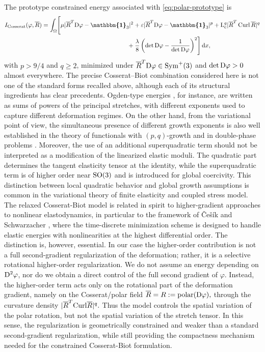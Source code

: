 \documentclass[11pt]{article}
\newcommand{\id}{{\boldsymbol{\mathbbm{1}}}}
\newcommand{\Curl}{{\rm Curl}}
\begin{document}
The prototype constrained energy associated with \eqref{eq:polar-prototype} is
\begin{align}
\label{eq:constrained-prototype}
I_{\rm Cosserat}(\varphi, \overline R )
=
\int_\Omega\Biggl[
&\mu| \overline R ^T{\rm D}\varphi-\id_3|^2
+
\varepsilon| \overline R ^T{\rm D}\varphi-\id_3|^p
+
{\rm L}_{\rm c}^q | \overline R ^T\operatorname{Curl} \overline R |^q
\notag\\
&\qquad \qquad \qquad \qquad \qquad \quad +
\frac\lambda8
\left(\det{\rm D}\varphi-\frac1{\det{\rm D}\varphi}\right)^2
\Biggr] \,\mathrm dx,
\end{align}
with $p>9/4$ and $q\geq 2$, minimized under
$
 \overline R ^T{\rm D}\varphi\in\operatorname{Sym}^{+}(3)
$
and $\det{\rm D}\varphi>0$ almost everywhere. 
The precise Cosserat--Biot combination considered here is not one of the standard forms recalled above, although each of its structural ingredients has clear precedents.  Ogden-type energies \cite{Ogden72a,Ogden83}, for instance, are written as sums
of powers of the principal stretches, with different exponents used to capture
different deformation regimes. On the  other hand, from the variational point of view, the simultaneous presence of different
growth exponents is also well established in the theory of functionals with
\((p,q)\)-growth and in double-phase problems \cite{Marcellini1,Marcellini2}. Moreover, the use of an additional superquadratic term should not be interpreted as a
modification of the linearized elastic moduli. The quadratic part determines
the tangent elasticity tensor at the identity, while the superquadratic term is
of higher order near \({\rm SO}(3)\) and is introduced for global coercivity.
This distinction between local quadratic behavior and global growth
assumptions is common in the variational theory of finite elasticity and coupled stress model. 
The relaxed Cosserat-Biot  model is related in spirit to higher-gradient approaches to
nonlinear elastodynamics, in particular to the framework of
{\v C}e{\v s}{\'i}k and Schwarzacher \cite{vcevsik2025stability}, where the time-discrete
minimization scheme is designed to handle elastic energies with nonlinearities
at the highest differential order. The distinction is, however, essential. In
our case the higher-order contribution is not a full second-gradient
regularization of the deformation; rather, it is a selective rotational higher-order regularization. We do not assume an energy depending on
\({\rm D}^2\varphi\), nor do we obtain a direct control of the full second
gradient of \(\varphi\). Instead, the higher-order term acts only on the
rotational part of the deformation gradient, namely on the Cosserat/polar field
$
     \overline R=R:=\operatorname{polar}({\rm D}\varphi),
$
through the curvature density
$
       |\overline R^T\Curl \overline R |^q .
$
Thus the model controls the spatial variation of the polar rotation, but not
the spatial variation of the stretch tensor. In this sense, the regularization
is geometrically constrained and weaker than a standard second-gradient
regularization, while still providing the compactness mechanism needed for the
constrained Cosserat-Biot formulation.
\end{document}
